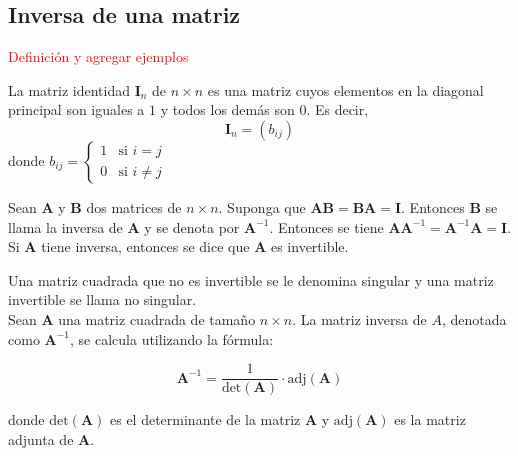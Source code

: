 \subsection{Inversa de una matriz}
\textcolor{red}{ Definición y agregar ejemplos}
\begin{definition}
La matriz identidad $\boldsymbol{I}_n$ de $n \times n$ es una matriz cuyos elementos en la diagonal principal son iguales a $1$ y todos los demás son $0$. Es decir,
$$ \boldsymbol{I}_n = (b_{ij}) $$
donde $b_{ij} = \begin{cases} 1 & \text{si } i = j \\ 0 & \text{si } i \neq j \end{cases} $    
\end{definition}
\begin{definition}
 Sean $\boldsymbol{A}$ y $\boldsymbol{B}$ dos matrices de $n \times n$. Suponga que $\boldsymbol{AB} = \boldsymbol{BA} = \boldsymbol{I}$. Entonces $\boldsymbol{B}$ se llama la inversa de $\boldsymbol{A}$ y se denota por $\boldsymbol{A}^{-1}$. Entonces se tiene $\boldsymbol{AA}^{-1} = \boldsymbol{A}^{-1}\boldsymbol{A} = \boldsymbol{I}$. Si $\boldsymbol{A}$ tiene inversa, entonces se dice que $\boldsymbol{A}$ es invertible.   
\end{definition}
Una matriz cuadrada que no es invertible se le denomina singular y una matriz invertible se 
llama no singular.\\
Sean $\boldsymbol{A}$ una matriz cuadrada de tamaño $n \times n$. La matriz inversa de $A$, denotada como $\boldsymbol{A}^{-1}$, se calcula utilizando la fórmula:

\[
\boldsymbol{A}^{-1} = \frac{1}{{\text{{det}}(\boldsymbol{A})}} \cdot \text{{adj}}(\boldsymbol{A})
\]

donde $\text{{det}}(\boldsymbol{A})$ es el determinante de la matriz $\boldsymbol{A}$ y $\text{{adj}}(\boldsymbol{A})$ es la matriz adjunta de $\boldsymbol{A}$.

